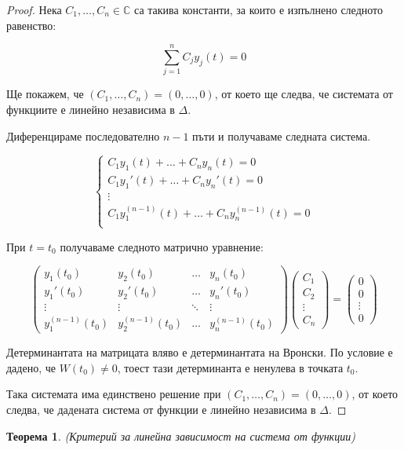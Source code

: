 \documentclass{scrartcl}
\newtheorem{theorem}{Теорема}
\begin{document}
\begin{FlushLeft}
\begin{proof}
Нека $C_1, \dots, C_n \in \mathbb{C}$ са такива константи, за които е изпълнено следното равенство:

$$\sum_{j=1}^n C_jy_j(t) = 0$$

Ще покажем, че $(C_1, \dots, C_n) = (0, \dots, 0)$, от което ще следва, че системата от функциите е линейно независима в $\Delta$.

Диференцираме последователно $n-1$ пъти и получаваме следната система.

$$
\begin{cases}
    C_1y_1(t) + \dots + C_ny_n(t) = 0\\
    C_1y_1'(t) + \dots + C_ny_n'(t) = 0\\
    \vdots\\
    C_1y_1^{(n-1)}(t) + \dots + C_ny_n^{(n-1)}(t) = 0\\
\end{cases}
$$

При $t = t_0$ получаваме следното матрично уравнение:

$$
\begin{pmatrix}
    y_1(t_0) & y_2(t_0) & \dots & y_n(t_0) \\
    y_1'(t_0) & y_2'(t_0) & \dots & y_n'(t_0) \\
    \vdots & \vdots & \ddots & \vdots \\
    y_1^{(n-1)}(t_0) & y_2^{(n-1)}(t_0) & \dots & y_n^{(n-1)}(t_0)
\end{pmatrix}
\begin{pmatrix}
    C_1\\
    C_2\\
    \vdots\\
    C_n
\end{pmatrix}
=
\begin{pmatrix}
    0\\
    0\\
    \vdots\\
    0
\end{pmatrix}
$$

Детерминантата на матрицата вляво е детерминантата на Вронски. По условие е дадено, че $W(t_0) \ne 0$, тоест тази детерминанта е ненулева в точката $t_0$.

Така системата има единствено решение при $(C_1, \dots, C_n) = (0, \dots, 0)$, от което следва, че дадената система от функции е линейно независима в $\Delta$.
\end{proof}

\begin{theorem}
(Критерий за линейна зависимост на система от функции)


\end{theorem}
\end{FlushLeft}
\end{document}
